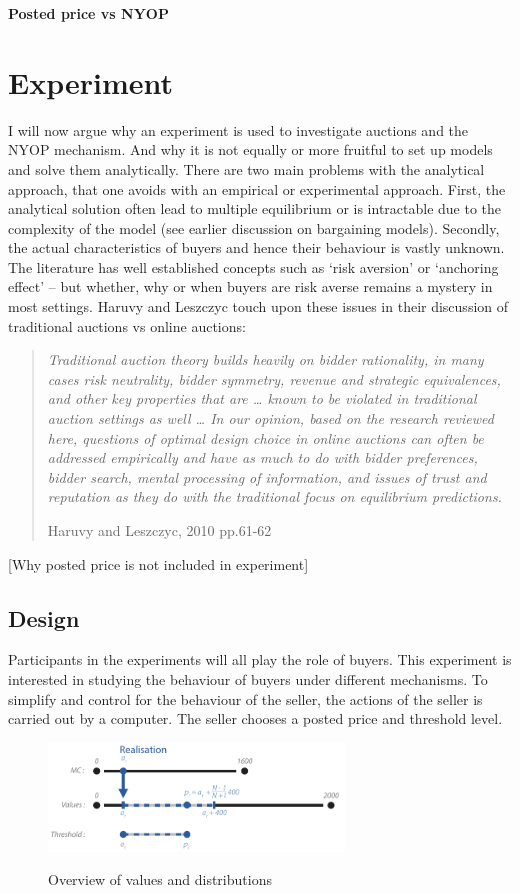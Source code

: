 \documentclass[a4paper,12pt]{article}
\begin{document}
	{\bf Posted price vs NYOP}


	\section{Experiment}

	I will now argue why an experiment is used to investigate auctions and the NYOP mechanism. And why it is not equally or more fruitful to set up models and solve them analytically. There are two main problems with the analytical approach, that one avoids with an empirical or experimental approach. First, the analytical solution often lead to multiple equilibrium or is intractable due to the complexity of the model (see earlier discussion on bargaining models). Secondly, the actual characteristics of buyers and hence their behaviour is vastly unknown. The literature has well established concepts such as `risk aversion' or `anchoring effect' -- but whether, why or when buyers are risk averse remains a mystery in most settings. Haruvy and Leszczyc touch upon these issues in their discussion of traditional auctions vs online auctions:
	\blockquote[Haruvy and Leszczyc, 2010 pp.61-62]{\emph{Traditional auction theory builds heavily on bidder rationality, in many cases risk neutrality, bidder symmetry, revenue and strategic equivalences, and other key properties that are … known to be violated in traditional auction settings as well … In our opinion, based on the research reviewed here, questions of optimal design choice in online auctions can often be addressed empirically and have as much to do with bidder preferences, bidder search, mental processing of information, and issues of trust and reputation as they do with the traditional focus on equilibrium predictions. }}

[Why posted price is not included in experiment]

	\subsection{Design}

	Participants in the experiments will all play the role of buyers. This experiment is interested in studying the behaviour of buyers under different mechanisms. To simplify and control for the behaviour of the seller, the actions of the seller is carried out by a computer. The seller chooses a posted price and threshold level.

	\begin{figure}[h]
	        \centering
	        \caption{Overview of values and distributions}
	        \includegraphics[width=0.7\textwidth]{Figures/Distribution}
			\label{fig:distribution}
	\end{figure}
\end{document}
